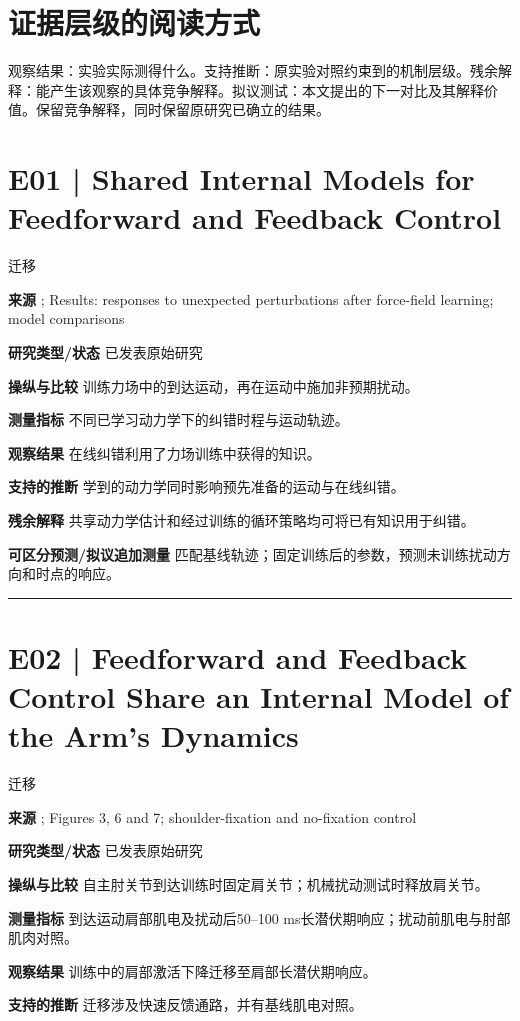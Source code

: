 \documentclass[11pt,a4paper]{article}
\begin{document}
\section{证据层级的阅读方式}
观察结果：实验实际测得什么。支持推断：原实验对照约束到的机制层级。残余解释：能产生该观察的具体竞争解释。拟议测试：本文提出的下一对比及其解释价值。保留竞争解释，同时保留原研究已确立的结果。
\clearpage\section{E01 | Shared Internal Models for Feedforward and Feedback Control}
{\small\sffamily\color{navy} 迁移}\par
\textbf{来源} \cite{wagner2008}; Results: responses to unexpected perturbations after force-field learning; model comparisons\par
\textbf{研究类型/状态} 已发表原始研究\par
\textbf{操纵与比较} 训练力场中的到达运动，再在运动中施加非预期扰动。\par
\textbf{测量指标} 不同已学习动力学下的纠错时程与运动轨迹。\par
\textbf{观察结果} 在线纠错利用了力场训练中获得的知识。\par
\textbf{支持的推断} 学到的动力学同时影响预先准备的运动与在线纠错。\par
\textbf{残余解释} 共享动力学估计和经过训练的循环策略均可将已有知识用于纠错。\par
\textbf{可区分预测/拟议追加测量} 匹配基线轨迹；固定训练后的参数，预测未训练扰动方向和时点的响应。\par
\bigskip\hrule\medskip\section{E02 | Feedforward and Feedback Control Share an Internal Model of the Arm's Dynamics}
{\small\sffamily\color{navy} 迁移}\par
\textbf{来源} \cite{maeda2018}; Figures 3, 6 and 7; shoulder-fixation and no-fixation control\par
\textbf{研究类型/状态} 已发表原始研究\par
\textbf{操纵与比较} 自主肘关节到达训练时固定肩关节；机械扰动测试时释放肩关节。\par
\textbf{测量指标} 到达运动肩部肌电及扰动后50--100 ms长潜伏期响应；扰动前肌电与肘部肌肉对照。\par
\textbf{观察结果} 训练中的肩部激活下降迁移至肩部长潜伏期响应。\par
\textbf{支持的推断} 迁移涉及快速反馈通路，并有基线肌电对照。\par
\end{document}
